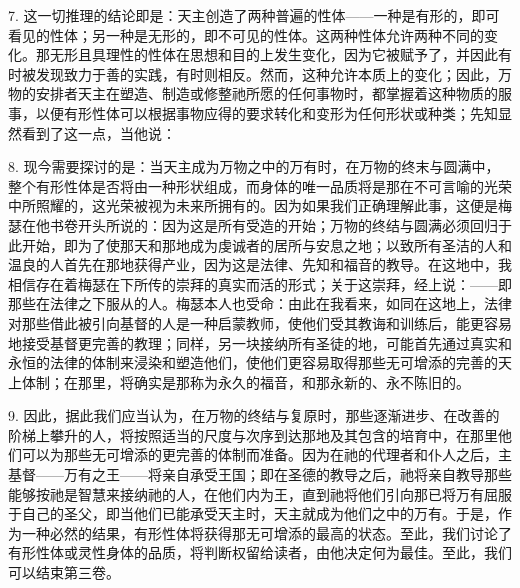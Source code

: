 7. 这一切推理的结论即是：天主创造了两种普遍的性体——一种是有形的，即可看见的性体；另一种是无形的，即不可见的性体。这两种性体允许两种不同的变化。那无形且具理性的性体在思想和目的上发生变化，因为它被赋予了，并因此有时被发现致力于善的实践，有时则相反。然而，这种允许本质上的变化；因此，万物的安排者天主在塑造、制造或修整祂所愿的任何事物时，都掌握着这种物质的服事，以便有形性体可以根据事物应得的要求转化和变形为任何形状或种类；先知显然看到了这一点，当他说：\par

8. 现今需要探讨的是：当天主成为万物之中的万有时，在万物的终末与圆满中，整个有形性体是否将由一种形状组成，而身体的唯一品质将是那在不可言喻的光荣中所照耀的，这光荣被视为未来所拥有的。因为如果我们正确理解此事，这便是梅瑟在他书卷开头所说的：因为这是所有受造的开始；万物的终结与圆满必须回归于此开始，即为了使那天和那地成为虔诚者的居所与安息之地；以致所有圣洁的人和温良的人首先在那地获得产业，因为这是法律、先知和福音的教导。在这地中，我相信存在着梅瑟在下所传的崇拜的真实而活的形式；关于这崇拜，经上说：——即那些在法律之下服从的人。梅瑟本人也受命：由此在我看来，如同在这地上，法律对那些借此被引向基督的人是一种启蒙教师，使他们受其教诲和训练后，能更容易地接受基督更完善的教理；同样，另一块接纳所有圣徒的地，可能首先通过真实和永恒的法律的体制来浸染和塑造他们，使他们更容易取得那些无可增添的完善的天上体制；在那里，将确实是那称为永久的福音，和那永新的、永不陈旧的。\par

9. 因此，据此我们应当认为，在万物的终结与复原时，那些逐渐进步、在改善的阶梯上攀升的人，将按照适当的尺度与次序到达那地及其包含的培育中，在那里他们可以为那些无可增添的更完善的体制而准备。因为在祂的代理者和仆人之后，主基督——万有之王——将亲自承受王国；即在圣德的教导之后，祂将亲自教导那些能够按祂是智慧来接纳祂的人，在他们内为王，直到祂将他们引向那已将万有屈服于自己的圣父，即当他们已能承受天主时，天主就成为他们之中的万有。于是，作为一种必然的结果，有形性体将获得那无可增添的最高的状态。至此，我们讨论了有形性体或灵性身体的品质，将判断权留给读者，由他决定何为最佳。至此，我们可以结束第三卷。\par



